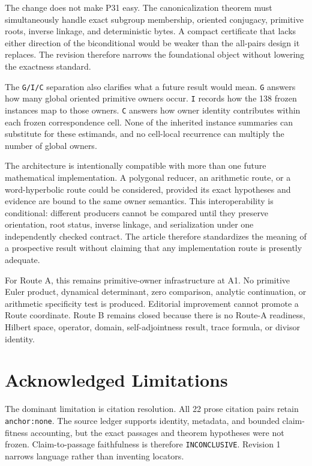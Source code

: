 \documentclass[11pt]{article}
\begin{document}
The change does not make P31 easy. The canonicalization theorem must
simultaneously handle exact subgroup membership, oriented conjugacy,
primitive roots, inverse linkage, and deterministic bytes. A compact
certificate that lacks either direction of the biconditional would be
weaker than the all-pairs design it replaces. The revision therefore
narrows the foundational object without lowering the exactness standard.

The \texttt{G/I/C} separation also clarifies what a future result would
mean. \texttt{G} answers how many global oriented primitive owners
occur. \texttt{I} records how the 138 frozen instances map to those
owners. \texttt{C} answers how owner identity contributes within each
frozen correspondence cell. None of the inherited instance summaries can
substitute for these estimands, and no cell-local recurrence can
multiply the number of global owners.

The architecture is intentionally compatible with more than one future
mathematical implementation. A polygonal reducer, an arithmetic route,
or a word-hyperbolic route could be considered, provided its exact
hypotheses and evidence are bound to the same owner semantics. This
interoperability is conditional: different producers cannot be compared
until they preserve orientation, root status, inverse linkage, and
serialization under one independently checked contract. The article
therefore standardizes the meaning of a prospective result without
claiming that any implementation route is presently adequate.

For Route A, this remains primitive-owner infrastructure at A1. No
primitive Euler product, dynamical determinant, zero comparison,
analytic continuation, or arithmetic specificity test is produced.
Editorial improvement cannot promote a Route coordinate. Route B remains
closed because there is no Route-A readiness, Hilbert space, operator,
domain, self-adjointness result, trace formula, or divisor identity.

\hypertarget{8-acknowledged-limitations}{%
\section{Acknowledged
Limitations}\label{8-acknowledged-limitations}}

The dominant limitation is citation resolution. All 22 prose citation
pairs retain \texttt{anchor:none}. The source ledger supports identity,
metadata, and bounded claim-fitness accounting, but the exact passages
and theorem hypotheses were not frozen. Claim-to-passage faithfulness is
therefore \texttt{INCONCLUSIVE}. Revision 1 narrows language rather than
inventing locators.
\end{document}
